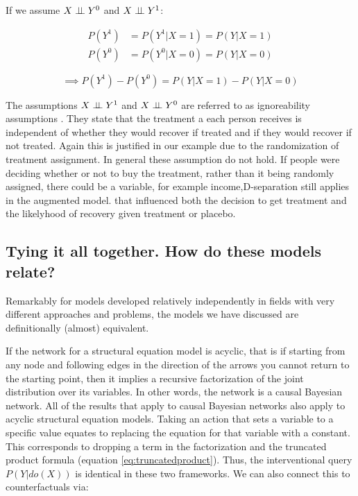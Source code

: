 \documentclass[11pt,a4paper]{article}
\begin{document}
If we assume $X \perp\!\!\!\perp Y^{0}$ and $X \perp\!\!\!\perp Y^{1}$:

\begin{equation}
\begin{aligned}
P(Y^{1}) &= P(Y^{1}|X=1) = P(Y|X=1) \\
P(Y^{0}) &= P(Y^{0}|X=0) = P(Y|X=0) 
\end{aligned}
\end{equation}

\begin{equation}
\implies P(Y^{1})-P(Y^{0}) = P(Y|X=1) - P(Y|X=0)
\end{equation}

The assumptions $X \perp\!\!\!\perp Y^{1}$ and $X \perp\!\!\!\perp Y^{0}$  are referred to as ignoreability assumptions \cite{Rosenbaum1983}. They state that the treatment a each person receives is independent of whether they would recover if treated and if they would recover if not treated. Again this is justified in our example due to the randomization of treatment assignment. In general these assumption do not hold. If people were deciding whether or not to buy the treatment, rather than it being randomly assigned, there could be a variable, for example income,D-separation still applies in the augmented model. that influenced both the decision to get treatment and the likelyhood of recovery given treatment or placebo.



\subsection{Tying it all together. How do these models relate?}

Remarkably for models developed relatively independently in fields with very different approaches and problems, the models we have discussed are definitionally (almost) equivalent. 

If the network for a structural equation model is acyclic, that is if starting from any node and following edges in the direction of the arrows you cannot return to the starting point, then it implies a recursive factorization of the joint distribution over its variables. In other words, the network is a causal Bayesian network. All of the results that apply to causal Bayesian networks also apply to acyclic structural equation models.  Taking an action that sets a variable to a specific value equates to replacing the equation for that variable with a constant. This corresponds to dropping a term in the factorization and the truncated product formula (equation \ref{eq:truncatedproduct}). Thus, the interventional query $P(Y|do(X))$ is identical in these two frameworks. We can also connect this to counterfactuals via:
\end{document}
